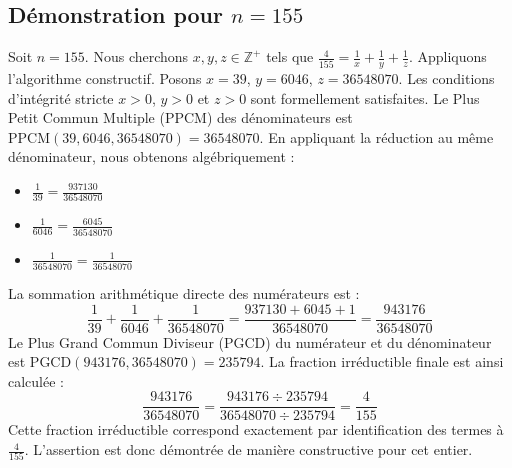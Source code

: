 \documentclass[11pt,a4paper]{article}
\begin{document}
\subsection{Démonstration pour $n = 155$}
Soit $n = 155$. Nous cherchons $x, y, z \in \mathbb{Z}^{+}$ tels que $\frac{4}{155} = \frac{1}{x} + \frac{1}{y} + \frac{1}{z}$.
Appliquons l'algorithme constructif. Posons $x = 39$, $y = 6046$, $z = 36548070$.
Les conditions d'intégrité stricte $x > 0$, $y > 0$ et $z > 0$ sont formellement satisfaites.
Le Plus Petit Commun Multiple (PPCM) des dénominateurs est $\text{PPCM}(39, 6046, 36548070) = 36548070$.
En appliquant la réduction au même dénominateur, nous obtenons algébriquement :
\begin{itemize}
    \item $\frac{1}{39} = \frac{937130}{36548070}$
    \item $\frac{1}{6046} = \frac{6045}{36548070}$
    \item $\frac{1}{36548070} = \frac{1}{36548070}$
\end{itemize}
La sommation arithmétique directe des numérateurs est :
$$ \frac{1}{39} + \frac{1}{6046} + \frac{1}{36548070} = \frac{937130 + 6045 + 1}{36548070} = \frac{943176}{36548070} $$
Le Plus Grand Commun Diviseur (PGCD) du numérateur et du dénominateur est $\text{PGCD}(943176, 36548070) = 235794$.
La fraction irréductible finale est ainsi calculée :
$$ \frac{943176}{36548070} = \frac{943176 \div 235794}{36548070 \div 235794} = \frac{4}{155} $$
Cette fraction irréductible correspond exactement par identification des termes à $\frac{4}{155}$. L'assertion est donc démontrée de manière constructive pour cet entier.
\end{document}

